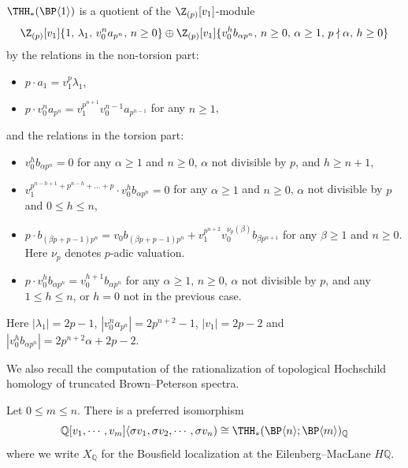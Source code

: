 \begin{theorem}\label{thm:AHL}
  $\THH_*(\BP \langle 1 \rangle)$ is a quotient of the $\Z_{(p)}[v_1]$-module
  \begin{multline}
    \Z_{(p)}[v_1]\{1,\, \lambda_1,\, v_0^n a_{p^n},\,n\geq 0\} 
    \oplus \Z_{(p)}[v_1]\{v_0^h b_{\alpha p^n},\, n\geq 0,\, \alpha\geq 1,\, p\nmid \alpha,\, h \geq 0\}
  \end{multline}
  by the relations in the non-torsion part:
  \begin{itemize}
  \item $p\cdot a_1 = v_1^p \lambda_1$,
  \item $p\cdot v_0^n a_{p^n} = v_1^{p^{n+1}}v_0^{n-1} a_{p^{n-1}}$ for any $n\geq 1$,
  \end{itemize}
  and the relations in the torsion part:
  \begin{itemize}
  \item $v_0^{h} b_{\alpha p^n} = 0$ for any $\alpha \geq 1$ and $n \geq 0$, $\alpha$ not divisible by $p$, and $h \geq n + 1$,
  \item $v_1^{p^{n-h+1}+p^{n-h}+\dots+p }\cdot v_0^h b_{\alpha p^n} = 0$ for any $\alpha \geq 1$ and $n \geq 0$, $\alpha$ not divisible by $p$ and  $0 \leq h \leq n$,
  \item $p\cdot b_{(\beta p+p-1)p^n} = v_0 b_{(\beta p+p-1)p^n}+v_1^{p^{n+2}}v_0^{\nu_p(\beta)} b_{\beta p^{n+1}}$ for any $\beta \geq 1$ and $n \geq 0$. Here $\nu_p$ denotes $p$-adic valuation.
  \item $p\cdot v_0^h b_{\alpha p^n} = v_0^{h+1} b_{\alpha p^n}$ for any $\alpha \geq 1$, $n \geq 0$, $\alpha$ not divisible by $p$, and any $1 \leq h \leq n$, or $h=0$ not in the previous case.
  \end{itemize}
Here $|\lambda_1|=2p-1$, $|v_0^na_{p^n}|=2p^{n+2}-1$, $|v_1|=2p-2$ and $|v_0^hb_{\alpha p^n}|=2p^{n+2}\alpha+2p-2$.
\end{theorem}

We also recall the computation of the rationalization of topological Hochschild homology of truncated Brown--Peterson spectra. 

\begin{proposition}\label{prop:rational}
Let $0\le m\le n$. There is a preferred isomorphism 
\[ 
\mathbb{Q}[v_1,\cdots ,v_m]\langle\sigma v_1,\sigma v_2,\cdots ,\sigma v_n) \cong \THH_*(\BP\langle n\rangle ; \BP\langle m\rangle)_{\mathbb{Q}} 
\]
where we write $X_{\mathbb{Q}}$ for the Bousfield localization at the Eilenberg--MacLane $H\mathbb{Q}$. 
\end{proposition}
